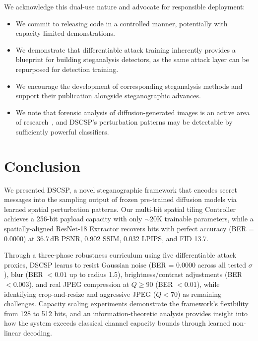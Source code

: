 \documentclass[conference]{IEEEtran}
\begin{document}
We acknowledge this dual-use nature and advocate for responsible deployment:
\begin{itemize}[itemsep=1pt, topsep=2pt]
    \item We commit to releasing code in a controlled manner, potentially with capacity-limited demonstrations.
    \item We demonstrate that differentiable attack training inherently provides a blueprint for building steganalysis detectors, as the same attack layer can be repurposed for detection training.
    \item We encourage the development of corresponding steganalysis methods and support their publication alongside steganographic advances.
    \item We note that forensic analysis of diffusion-generated images is an active area of research~\cite{corvi2023detection}, and DSCSP's perturbation patterns may be detectable by sufficiently powerful classifiers.
\end{itemize}


\section{Conclusion}
\label{sec:conclusion}

We presented DSCSP, a novel steganographic framework that encodes secret messages into the sampling output of frozen pre-trained diffusion models via learned spatial perturbation patterns.
Our multi-bit spatial tiling Controller achieves a 256-bit payload capacity with only $\sim$20K trainable parameters, while a spatially-aligned ResNet-18 Extractor recovers bits with perfect accuracy (BER = 0.0000) at 36.7\,dB PSNR, 0.902 SSIM, 0.032 LPIPS, and FID 13.7.

Through a three-phase robustness curriculum using five differentiable attack proxies, DSCSP learns to resist Gaussian noise (BER = 0.0000 across all tested $\sigma$), blur (BER $< 0.01$ up to radius 1.5), brightness/contrast adjustments (BER $< 0.003$), and real JPEG compression at $Q \geq 90$ (BER $< 0.01$), while identifying crop-and-resize and aggressive JPEG ($Q < 70$) as remaining challenges.
Capacity scaling experiments demonstrate the framework's flexibility from 128 to 512 bits, and an information-theoretic analysis provides insight into how the system exceeds classical channel capacity bounds through learned non-linear decoding.
\end{document}
